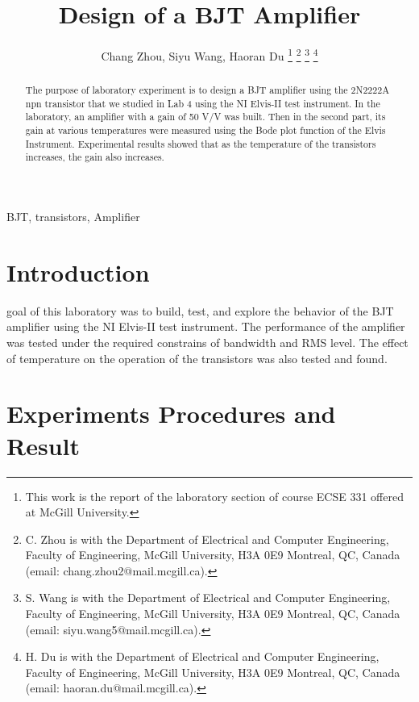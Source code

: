 \documentclass[journal]{IEEEtran}
\begin{document}
\begin{titlepage}

\end{titlepage}
\title{Design of a BJT Amplifier}
\author{Chang Zhou, Siyu Wang, Haoran Du
\thanks{This work is the report of the laboratory section of course ECSE 331 offered at McGill University.}
\thanks{C. Zhou is with the Department of Electrical and Computer
Engineering, Faculty of Engineering, McGill University, H3A 0E9 Montreal, QC, Canada
(email: chang.zhou2@mail.mcgill.ca).}
\thanks{S. Wang is with the Department of Electrical and Computer
Engineering, Faculty of Engineering, McGill University, H3A 0E9 Montreal, QC, Canada
(email: siyu.wang5@mail.mcgill.ca).}
\thanks{H. Du is with the Department of Electrical and Computer
Engineering, Faculty of Engineering, McGill University, H3A 0E9 Montreal, QC, Canada
(email: haoran.du@mail.mcgill.ca).}}

\maketitle

\begin{abstract}
The purpose of laboratory experiment is to design a BJT amplifier using the 2N2222A npn transistor that we studied in
Lab 4 using the NI Elvis-II test instrument. In the laboratory, an amplifier with a gain of 50 \si{\volt}/\si{\volt} was built. Then in the second part, its gain at various temperatures were measured using the Bode plot function of the Elvis Instrument. Experimental results showed that as the temperature of the transistors increases, the gain also increases.
\end{abstract}

\begin{IEEEkeywords}
  BJT, transistors, Amplifier
\end{IEEEkeywords}

\section{Introduction}

 goal of this laboratory was to build, test, and explore the behavior of the BJT amplifier using the NI Elvis-II test instrument. The performance of the amplifier was tested under the required constrains of bandwidth and RMS level. The effect of temperature on the operation of the transistors was also tested and found.
\section{Experiments Procedures and Result}
\end{document}
